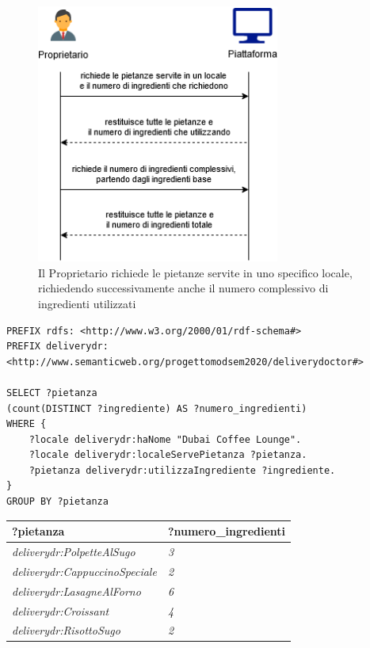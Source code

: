 \documentclass[12pt]{article}
\begin{document}
\begin{figure}[H]
    \centering
         \includegraphics[width=8cm]{files/Proprietario 3.png}
    \caption{Il Proprietario richiede le pietanze servite in uno specifico locale, richiedendo successivamente anche il numero complessivo di ingredienti utilizzati}
\end{figure}
\begin{lstlisting}[language=SPARQL]
PREFIX rdfs: <http://www.w3.org/2000/01/rdf-schema#>
PREFIX deliverydr: 
<http://www.semanticweb.org/progettomodsem2020/deliverydoctor#>

SELECT ?pietanza 
(count(DISTINCT ?ingrediente) AS ?numero_ingredienti) 
WHERE {
    ?locale deliverydr:haNome "Dubai Coffee Lounge".
    ?locale deliverydr:localeServePietanza ?pietanza.
    ?pietanza deliverydr:utilizzaIngrediente ?ingrediente.
}
GROUP BY ?pietanza
\end{lstlisting}
\begin{tabularx}{\textwidth} { 
  | >{\centering\arraybackslash}X 
  | >{\centering\arraybackslash}X |}
 \hline
 \textbf{?pietanza} & \textbf{?numero\_ingredienti} \\
 \hline
 \textit{deliverydr:PolpetteAlSugo} & \textit{3}  \\
 \hline
 \textit{deliverydr:CappuccinoSpeciale} & \textit{2}  \\
 \hline
 \textit{deliverydr:LasagneAlForno} & \textit{6}  \\
 \hline
 \textit{deliverydr:Croissant} & \textit{4}  \\
 \hline
 \textit{deliverydr:RisottoSugo} & \textit{2}  \\
 \hline
\end{tabularx}
\newline
\end{document}
